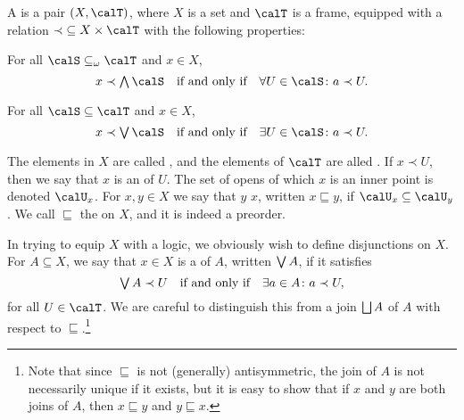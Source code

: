 \documentclass[a4paper, 11pt, article, danish, oneside]{memoir}
\DeclareMathOperator*{\smallbigvee}{\textstyle\bigvee}
\DeclareMathOperator*{\bigjoin}{\mathchoice
    {\smallbigvee}%
    {\bigvee}%
    {\bigvee}%
    {\bigvee}%
}
\DeclareMathOperator*{\smallbigsqcup}{\textstyle\bigsqcup}
\DeclareMathOperator*{\bigdjoin}{\mathchoice
    {\smallbigsqcup}%
    {\bigsqcup}%
    {\bigsqcup}%
    {\bigsqcup}%
}
\DeclareMathOperator*{\smallbigwedge}{\textstyle\bigwedge}
\DeclareMathOperator*{\bigmeet}{\mathchoice
    {\smallbigwedge}%
    {\bigwedge}%
    {\bigwedge}%
    {\bigwedge}%
}
\renewcommand{\prod}{\times}
\begin{document}
\newcommand{\inpoint}{\prec}
\newcommand{\opens}[1]{\calU_{#1}}
\newcommand{\specs}{\sqsubseteq}

\begin{definition}
    A  is a pair $(X,\calT)$, where $X$ is a set and $\calT$ is a frame, equipped with a relation ${\inpoint} \subseteq X \prod \calT$ with the following properties:
    \begin{enumdef}
        \item For all $\calS \subseteq_\omega \calT$ and $x \in X$,
        \begin{equation*}
            x \inpoint \bigmeet \calS
                \quad \text{if and only if} \quad
                \forall U \in \calS \colon a \inpoint U.
        \end{equation*}

        \item For all $\calS \subseteq \calT$ and $x \in X$,
        \begin{equation*}
            x \inpoint \bigjoin \calS
                \quad \text{if and only if} \quad
                \exists U \in \calS \colon a \inpoint U.
        \end{equation*}
    \end{enumdef}
\end{definition}
%
The elements in $X$ are called , and the elements of $\calT$ are alled . If $x \inpoint U$, then we say that $x$ is an  of $U$. The set of opens of which $x$ is an inner point is denoted $\opens{x}$. For $x,y \in X$ we say that $y$  $x$, written $x \specs y$, if $\opens{x} \subseteq \opens{y}$. We call $\specs$ the  on $X$, and it is indeed a preorder.

In trying to equip $X$ with a logic, we obviously wish to define disjunctions on $X$. For $A \subseteq X$, we say that $x \in X$ is a  of $A$, written $\bigjoin A$, if it satisfies
%
\begin{equation*}
    \bigjoin A \inpoint U
        \quad \text{if and only if} \quad
        \exists a \in A \colon a \inpoint U,
\end{equation*}
%
for all $U \in \calT$. We are careful to distinguish this from a join $\bigdjoin A$ of $A$ with respect to $\specs$.\footnote{Note that since $\specs$ is not (generally) antisymmetric, the join of $A$ is not necessarily unique if it exists, but it is easy to show that if $x$ and $y$ are both joins of $A$, then $x \specs y$ and $y \specs x$.}
\end{document}

